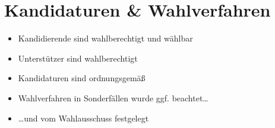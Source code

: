 \documentclass[a4paper]{scrartcl}
\begin{document}
\section{Kandidaturen \& Wahlverfahren}
\begin{itemize}[label=$\Box$]
\item Kandidierende sind wahlberechtigt und wählbar
\item Unterstützer sind wahlberechtigt
\item Kandidaturen sind ordnungsgemäß
\item Wahlverfahren in Sonderfällen wurde ggf. beachtet\dots
\item \dots und vom Wahlausschuss festgelegt
\end{itemize}









\end{document}
